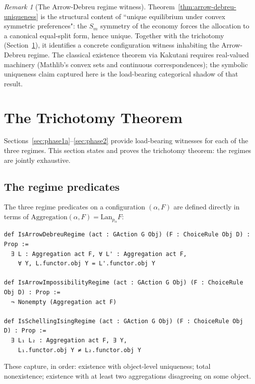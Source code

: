\documentclass[11pt,a4paper]{article}
\theoremstyle{plain}
\theoremstyle{definition}
\theoremstyle{remark}
\newtheorem{remark}[theorem]{Remark}
\newcommand{\Lan}{\mathrm{Lan}}
\newcommand{\Sm}{S_{m}}
\begin{document}
\begin{remark}[The Arrow-Debreu regime witness]
Theorem~\ref{thm:arrow-debreu-uniqueness} is the structural content of
``unique equilibrium under convex symmetric preferences": the $\Sm$
symmetry of the economy forces the allocation to a canonical
equal-split form, hence unique.  Together with the trichotomy
(Section~\ref{sec:trichotomy}), it identifies a concrete configuration
witness inhabiting the Arrow-Debreu regime.  The classical existence
theorem via Kakutani requires real-valued machinery (Mathlib's convex
sets and continuous correspondences); the symbolic uniqueness claim
captured here is the load-bearing categorical shadow of that result.
\end{remark}

\section{The Trichotomy Theorem}
\label{sec:trichotomy}

Sections~\ref{sec:phase1a}--\ref{sec:phase2} provide load-bearing
witnesses for each of the three regimes.  This section states and
proves the trichotomy theorem: the regimes are jointly exhaustive.

\subsection{The regime predicates}

The three regime predicates on a configuration $(\alpha, F)$ are
defined directly in terms of $\mathrm{Aggregation}(\alpha, F) =
\Lan_{p_\alpha} F$:

\begin{lstlisting}
def IsArrowDebreuRegime (act : GAction G Obj) (F : ChoiceRule Obj D) : Prop :=
  ∃ L : Aggregation act F, ∀ L' : Aggregation act F,
    ∀ Y, L.functor.obj Y = L'.functor.obj Y

def IsArrowImpossibilityRegime (act : GAction G Obj) (F : ChoiceRule Obj D) : Prop :=
  ¬ Nonempty (Aggregation act F)

def IsSchellingIsingRegime (act : GAction G Obj) (F : ChoiceRule Obj D) : Prop :=
  ∃ L₁ L₂ : Aggregation act F, ∃ Y,
    L₁.functor.obj Y ≠ L₂.functor.obj Y
\end{lstlisting}

These capture, in order: existence with object-level uniqueness; total
nonexistence; existence with at least two aggregations disagreeing on
some object.
\end{document}
